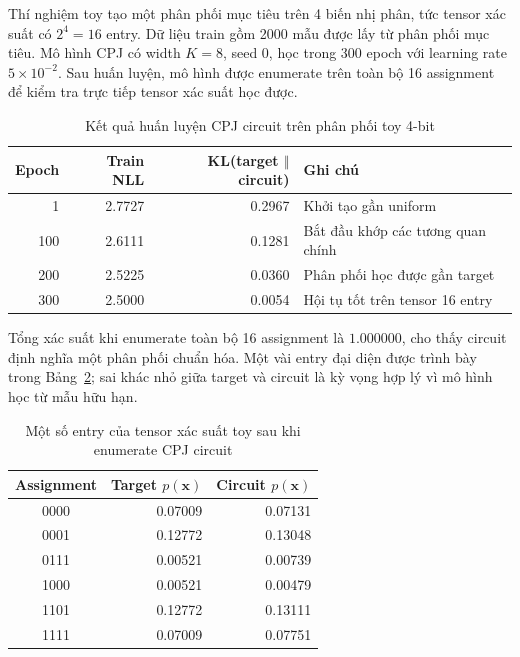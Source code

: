 Thí nghiệm toy tạo một phân phối mục tiêu trên 4 biến nhị phân, tức tensor xác
suất có $2^4 = 16$ entry. Dữ liệu train gồm 2000 mẫu được lấy từ phân phối mục
tiêu. Mô hình CPJ có width $K=8$, seed 0, học trong 300 epoch với learning rate
$5\times 10^{-2}$. Sau huấn luyện, mô hình được enumerate trên toàn bộ 16
assignment để kiểm tra trực tiếp tensor xác suất học được.

\begin{table}[H]
\centering
\caption{Kết quả huấn luyện CPJ circuit trên phân phối toy 4-bit}
\label{tab:pc-toy-training}
\renewcommand{\arraystretch}{1.2}
\begin{tabular}{rrrl}
\toprule
\textbf{Epoch} & \textbf{Train NLL} & \textbf{KL(target $\Vert$ circuit)} & \textbf{Ghi chú} \\
\midrule
1   & 2.7727 & 0.2967 & Khởi tạo gần uniform \\
100 & 2.6111 & 0.1281 & Bắt đầu khớp các tương quan chính \\
200 & 2.5225 & 0.0360 & Phân phối học được gần target \\
300 & 2.5000 & 0.0054 & Hội tụ tốt trên tensor 16 entry \\
\bottomrule
\end{tabular}
\end{table}

Tổng xác suất khi enumerate toàn bộ 16 assignment là $1.000000$, cho thấy circuit
định nghĩa một phân phối chuẩn hóa. Một vài entry đại diện được trình bày trong
Bảng~\ref{tab:pc-toy-entries}; sai khác nhỏ giữa target và circuit là kỳ vọng
hợp lý vì mô hình học từ mẫu hữu hạn.

\begin{table}[H]
\centering
\caption{Một số entry của tensor xác suất toy sau khi enumerate CPJ circuit}
\label{tab:pc-toy-entries}
\renewcommand{\arraystretch}{1.2}
\begin{tabular}{crr}
\toprule
\textbf{Assignment} & \textbf{Target $p(\mathbf{x})$} & \textbf{Circuit $p(\mathbf{x})$} \\
\midrule
0000 & 0.07009 & 0.07131 \\
0001 & 0.12772 & 0.13048 \\
0111 & 0.00521 & 0.00739 \\
1000 & 0.00521 & 0.00479 \\
1101 & 0.12772 & 0.13111 \\
1111 & 0.07009 & 0.07751 \\
\bottomrule
\end{tabular}
\end{table}


